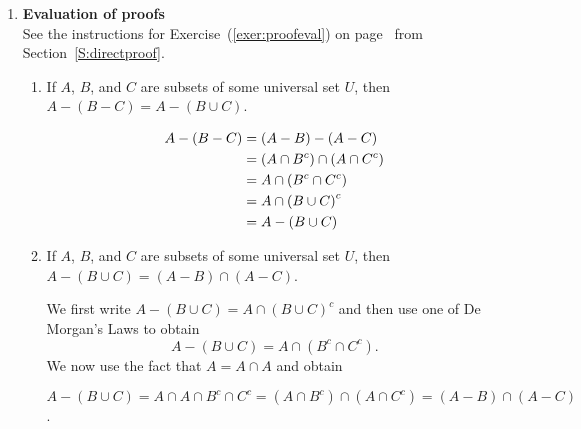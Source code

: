 \begin{enumerate}
\item \textbf{Evaluation of proofs}  \hfill \\
See the instructions for Exercise~(\ref{exer:proofeval}) on 
page~\pageref{exer:proofeval} from Section~\ref{S:directproof}.

\begin{enumerate}
\item If $A$, $B$, and $C$ are subsets of some universal set $U$, then 
$A - \left( B - C \right) = A - \left(B \cup C \right)$.

\begin{myproof}
\[
\begin{aligned}
A - \left( B - C \right) &= \left(A - B \right) - \left( A - C \right) \\
                         &= \left( A \cap B^c \right) \cap \left(A \cap C^c \right) \\
                         &= A \cap \left( B^c \cap C^c\right) \\
                         &= A \cap \left( B \cup C \right)^c \\
                         &= A - \left( B \cup C \right) \hfill 
\end{aligned}
\] \qedhere
\end{myproof}

\item If $A$, $B$, and $C$ are subsets of some universal set $U$, then 
$A - \left(B \cup C \right) = \left(A - B \right) \cap \left(A - C \right)$.

\begin{myproof}
We first write $A - \left(B \cup C \right) = A \cap \left(B \cup C \right)^c$ and then use one of De Morgan's Laws to obtain
\[ 
A - \left(B \cup C \right)= A \cap \left(B^c \cap C^c \right).
\]
We now use the fact that $A = A \cap A$ and obtain

$A - \left(B \cup C \right)= A \cap A \cap B^c \cap C^c 
= \left(A \cap B^c \right) \cap \left(A \cap C^c \right) 
= \left(A - B \right) \cap \left(A - C \right)$. 
\end{myproof}
\end{enumerate}
\end{enumerate}


